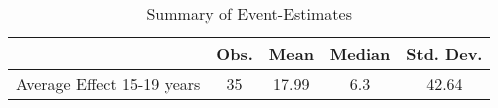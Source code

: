 \begin{table}[htbp]\centering
\def\sym#1{\ifmmode^{#1}\else\(^{#1}\)\fi}
\caption{Summary of Event-Estimates}
\begin{tabular}{l*{1}{cccc}}
\toprule
                    &        Obs.&        Mean&      Median&   Std. Dev.\\
\midrule
Average Effect 15-19 years&          35&       17.99&         6.3&       42.64\\
\bottomrule
\end{tabular}
\end{table}
